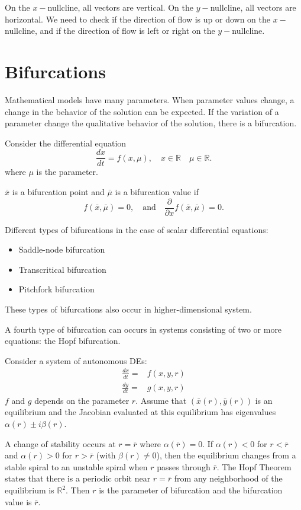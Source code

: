 On the $x-$nullcline, all vectors are vertical. On the $y-$nullcline, all vectors are horizontal.
We need to check if the direction of flow is up or down on the $x-$nullcline, and if the direction of flow is left or right on the $y-$nullcline.

\section{Bifurcations}
Mathematical models have many parameters. When parameter values change, a change in the behavior of the solution can be expected. If the variation of a parameter change the qualitative behavior of the solution, there is a bifurcation.


Consider the differential equation
$$\frac{dx}{dt}=f(x,\mu), \quad x\in \mathbb{R} \quad \mu \in \mathbb{R}.$$
where $\mu$ is the parameter.

\begin{definition}
$\bar x$ is a bifurcation point and $\bar \mu$ is a bifurcation value if
$$f(\bar x, \bar \mu)=0, \quad \textrm{and} \quad \frac{\partial }{\partial x}f(\bar x, \bar \mu)=0.$$
\end{definition}


Different types of bifurcations in the case of scalar differential equations:
\begin{itemize}
\item Saddle-node bifurcation
\item Transcritical bifurcation
\item Pitchfork bifurcation
\end{itemize}
These types of bifurcations also occur in higher-dimensional system.

A fourth type of bifurcation can occurs in systems consisting of two or more equations: the Hopf bifurcation.

Consider a system of autonomous DEs:
\begin{align*}
\frac{dx}{dt}=&f(x,y,r)\\
\frac{dy}{dt}=&g(x,y,r)
\end{align*}
$f$ and $g$ depends on the parameter $r$. Assume that $(\bar x(r), \bar y(r))$ is an equilibrium and the Jacobian evaluated at this equilibrium has eigenvalues $\alpha(r)\pm i \beta (r)$.

A change of stability occurs at $r=\bar r$ where $\alpha (\bar r)=0$. If $\alpha (r)<0$ for $r<\bar r$ and $\alpha (r)>0$ for $r>\bar r$ (with $\beta (r)\not =0$), then the equilibrium changes from a stable spiral to an unstable spiral when $r$ passes through $\bar r$. The Hopf Theorem states that there is a periodic orbit near $r=\bar r$ from any neighborhood of the equilibrium is $\mathbb{R}^2$. Then $r$ is the parameter of bifurcation and the bifurcation value is $\bar r$.



